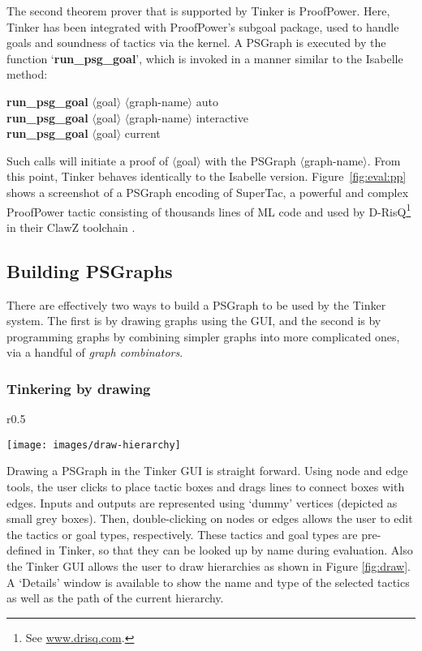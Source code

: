 \documentclass[submission,copyright,creativecommons]{eptcs}
\begin{document}
The second theorem prover that is supported by Tinker is ProofPower. Here, Tinker has been integrated with ProofPower's subgoal package, used to 
handle goals and soundness of tactics via the kernel. A PSGraph is executed by the function `\textbf{run\_psg\_goal}', which is invoked in a manner similar to the Isabelle method:
\begin{tabbing}
\sf\qquad\quad\textbf{run\_psg\_goal} $\langle$goal$\rangle$ $\langle$graph-name$\rangle$ auto\\
\sf\qquad\quad\textbf{run\_psg\_goal} $\langle$goal$\rangle$ $\langle$graph-name$\rangle$ interactive\\
\sf\qquad\quad\textbf{run\_psg\_goal} $\langle$goal$\rangle$ current
\end{tabbing}
Such calls will initiate a proof of $\langle$goal$\rangle$ with the PSGraph \textsf{$\langle$graph-name$\rangle$}. From this point, Tinker behaves identically to the Isabelle version. Figure~\ref{fig:eval:pp} shows a screenshot of a PSGraph encoding of SuperTac, a powerful and complex ProofPower tactic consisting of thousands lines of ML code and used by D-RisQ\footnote{See \url{www.drisq.com}.} in their ClawZ toolchain \cite{OHalloran13}.


\subsection{Building PSGraphs}

There are effectively two ways to build a PSGraph to be used by the Tinker system. The first is by drawing graphs using the GUI, and the second is by 
programming graphs by combining simpler graphs into more complicated ones, via a handful of \textit{graph combinators}.

\subsubsection{Tinkering by drawing}

\begin{wrapfigure}[11]{r}{0.5\textwidth}
\vspace{-50pt}
\begin{center}
\texttt{[image: images/draw-hierarchy]}
\end{center}
\vspace{-10pt}
\caption{Tinker Drawing GUI}\label{fig:draw}
\end{wrapfigure}
Drawing a PSGraph in the Tinker GUI is straight forward. Using node and edge tools, the user clicks to place tactic boxes and drags lines to connect boxes with edges. Inputs and outputs are represented using `dummy' vertices (depicted as small grey boxes). Then, double-clicking on nodes or edges allows the user to edit the tactics or goal types, respectively. These tactics and goal types are pre-defined in Tinker, so that they can be looked up by name during evaluation. Also the Tinker GUI allows the user to draw hierarchies as shown in Figure  \ref {fig:draw}. A `Details' window is available to show the name and type of the selected tactics as well as the path of the current hierarchy.
\end{document}
